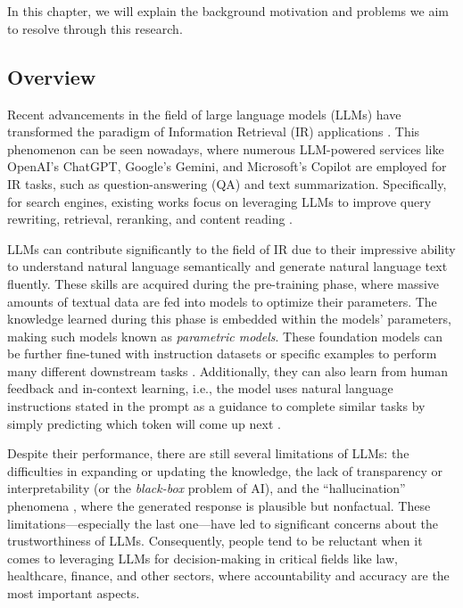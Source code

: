 \chapter{\babSatu}
\label{bab:1}
In this chapter, we will explain the background motivation and problems we aim to resolve through this research.


\section{Overview}
\label{sec:latarBelakang}
Recent advancements in the field of large language models (LLMs) have transformed the paradigm of Information Retrieval (IR) applications \citep{irparadigm}. This phenomenon can be seen nowadays, where numerous LLM-powered services like OpenAI's ChatGPT, Google's Gemini, and Microsoft's Copilot are employed for IR tasks, such as question-answering (QA) and text summarization. Specifically, for search engines, existing works focus on leveraging LLMs to improve query rewriting, retrieval, reranking, and content reading \citep{zhu2024largelanguagemodelsinformation}.

LLMs can contribute significantly to the field of IR due to their impressive ability to understand natural language semantically and generate natural language text fluently. These skills are acquired during the pre-training phase, where massive amounts of textual data are fed into models to optimize their parameters. The knowledge learned during this phase is embedded within the models' parameters, making such models known as \textit{parametric models}. These foundation models can be further fine-tuned with instruction datasets or specific examples to perform many different downstream tasks \citep{ziegler2020finetuninglanguagemodelshuman}. Additionally, they can also learn from human feedback and in-context learning, i.e., the model uses natural language instructions stated in the prompt as a guidance to complete similar tasks by simply predicting which token will come up next \citep{brown2020gpt3}.

Despite their performance, there are still several limitations of LLMs: the difficulties in expanding or updating the knowledge, the lack of transparency or interpretability (or the \textit{black-box} problem of AI), and the ``hallucination'' phenomena \citep{lewis2021retrievalaugmentedgenerationknowledgeintensivenlp}, where the generated response is plausible but nonfactual. These limitations---especially the last one---have led to significant concerns about the trustworthiness of LLMs. Consequently, people tend to be reluctant when it comes to leveraging LLMs for decision-making in critical fields like law, healthcare, finance, and other sectors, where accountability and accuracy are the most important aspects.

